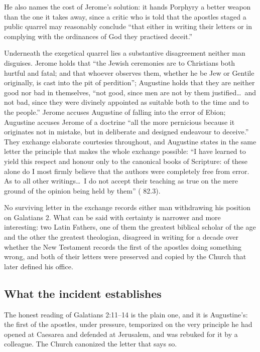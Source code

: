He also names the cost of Jerome's solution: it hands Porphyry a better
weapon than the one it takes away, since a critic who is told that the
apostles staged a public quarrel may reasonably conclude ``that either in
writing their letters or in complying with the ordinances of God they
practised deceit.''

Underneath the exegetical quarrel lies a substantive disagreement neither man
disguises. Jerome holds that ``the Jewish ceremonies are to Christians both
hurtful and fatal; and that whoever observes them, whether he be Jew or
Gentile originally, is cast into the pit of perdition''; Augustine holds that
they are neither good nor bad in themselves, ``not good, since men are not by
them justified\ldots\ and not bad, since they were divinely appointed as
suitable both to the time and to the people.'' Jerome accuses Augustine of
falling into the error of Ebion; Augustine accuses Jerome of a doctrine
``all the more pernicious because it originates not in mistake, but in
deliberate and designed endeavour to deceive.'' They exchange elaborate
courtesies throughout, and Augustine states in the same letter the principle
that makes the whole exchange possible: ``I have learned to yield this
respect and honour only to the canonical books of Scripture: of these alone
do I most firmly believe that the authors were completely free from error.
As to all other writings\ldots\ I do not accept their teaching as true on the
mere ground of the opinion being held by them'' ( 82.3).

No surviving letter in the exchange records either man withdrawing his
position on Galatians 2. What can be said with certainty is narrower and more
interesting: two Latin Fathers, one of them the greatest biblical scholar of
the age and the other the greatest theologian, disagreed in writing for a
decade over whether the New Testament records the first of the apostles doing
something wrong, and both of their letters were preserved and copied by the
Church that later defined his office.

\subsection{What the incident establishes}

The honest reading of Galatians 2:11--14 is the plain one, and it is
Augustine's: the first of the apostles, under pressure, temporized on the
very principle he had opened at Caesarea and defended at Jerusalem, and was
rebuked for it by a colleague. The Church canonized the letter that says so.

